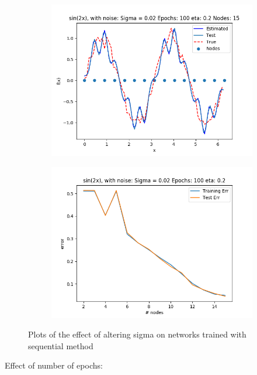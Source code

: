 \documentclass{article}
\begin{document}
\begin{figure}[ht!]
\begin{subfigure}[t]{0.4\textwidth}
        \includegraphics[width=1\textwidth]{plots/noise/seq_sin2x_100ep_sigma002}
        \caption{}
    \end{subfigure}
    \begin{subfigure}[t]{0.4\textwidth}
        \centering
        \includegraphics[width=1\textwidth]{plots/noise/seq_sin2x_100ep_sigma002_error}
        \caption{}
    \end{subfigure}
    \caption{Plots of the effect of altering sigma on networks trained with sequential method}
\end{figure}

Effect of number of epochs:
\end{document}
